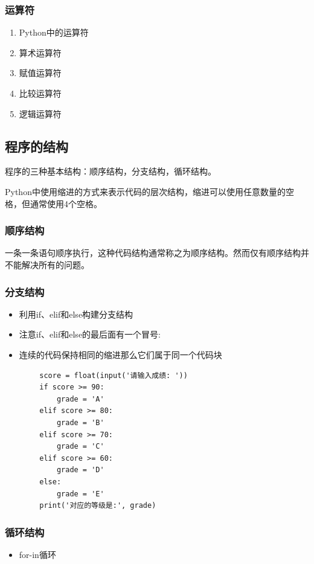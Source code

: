 \documentclass[10pt]{elegantnote}
\begin{document}
\begin{sloppypar}
\subsubsection{运算符}
\begin{enumerate}
  \item Python中的运算符
  \item 算术运算符
  \item 赋值运算符
  \item 比较运算符
  \item 逻辑运算符
\end{enumerate}

\subsection{程序的结构}

程序的三种基本结构：顺序结构，分支结构，循环结构。

Python中使用缩进的方式来表示代码的层次结构，缩进可以使用任意数量的空格，但通常使用4个空格。

\subsubsection{顺序结构}
一条一条语句顺序执行，这种代码结构通常称之为顺序结构。然而仅有顺序结构并不能解决所有的问题。
\subsubsection{分支结构}
    \begin{itemize}
      \item 利用if、elif和else构建分支结构
      \item 注意if、elif和else的最后面有一个冒号:
      \item 连续的代码保持相同的缩进那么它们属于同一个代码块
    \end{itemize}

    \begin{lstlisting}
        score = float(input('请输入成绩: '))
        if score >= 90:
            grade = 'A'
        elif score >= 80:
            grade = 'B'
        elif score >= 70:
            grade = 'C'
        elif score >= 60:
            grade = 'D'
        else:
            grade = 'E'
        print('对应的等级是:', grade)
    \end{lstlisting}
\subsubsection{循环结构}
    \begin{itemize}
      \item for-in循环
      

\end{itemize}
\end{sloppypar}
\end{document}

